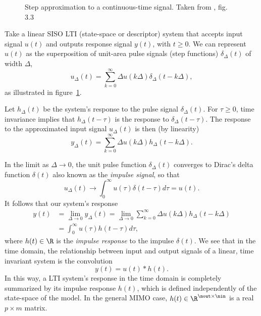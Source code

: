 \begin{figure}[ht]
\centering
{} 
\caption{Step approximation to a continuous-time signal.  Taken from \cite{Hespanha09}, fig. 3.3}
\label{fig:impulse}
\end{figure}


Take a linear SISO LTI (state-space or descriptor) system that accepts input signal $u(t)$ and outputs response signal $y(t)$, with $t\geq 0$.   We can represent $u(t)$ as the superposition  of unit-area pulse signals (step functions)  $\delta_\Delta(t)$ of width $\Delta$,
\begin{equation}
u_{\Delta}(t) = \sum_{k=0}^{\infty} \Delta u(k\Delta)\delta_\Delta(t-k\Delta),
\end{equation}
as illustrated in figure~\ref{fig:impulse}. 

Let $h_\Delta(t)$ be the system's response to the pulse signal $\delta_\Delta(t)$.  For $\tau\geq 0$, time invariance implies that  $h_\Delta(t-\tau)$ is the response to $\delta_\Delta(t-\tau)$.   The response to the approximated input signal $u_{\Delta}(t)$ is then (by linearity)
\begin{equation}
y_{\Delta}(t) = \sum_{k=0}^{\infty} \Delta u(k\Delta)h_\Delta(t-k\Delta).
\end{equation}

In the limit as  $\Delta\rightarrow 0$,  the unit pulse function $\delta_\Delta(t)$ converges to Dirac's delta function $\delta(t)$ also known as the \emph{impulse  signal}, so that 
\[  
u_\Delta(t)\rightarrow \int_0^\infty u(\tau) \delta(t-\tau) d\tau = u(t).
\]
    It follows that our system's response
\begin{align}
y(t) &= \lim_{\Delta\rightarrow 0} y_\Delta(t) = 
\lim_{\Delta\rightarrow 0}\sum_{k=0}^\infty \Delta u(k\Delta)h_\Delta(t-k\Delta) \nonumber\\
&=\int_0^\infty u(\tau) h(t-\tau) d\tau,
\end{align}
where $h(t)\in\R$ is the \emph{impulse response} to the impulse $\delta(t)$.
We see that in the time domain, the relationship between input and output signals of a linear, time invariant system is the convolution 
\begin{equation}
y(t)=u(t)*h(t).
\label{eq:impulse_response}
\end{equation}
   In this way, a LTI system's response in the time domain is completely summarized by its impulse response $h(t)$, which is defined independently of the state-space of the model.
In the general MIMO case, $h(t)\in\R^{\nout\times \nin}$ is a real $p \times m$ matrix.

